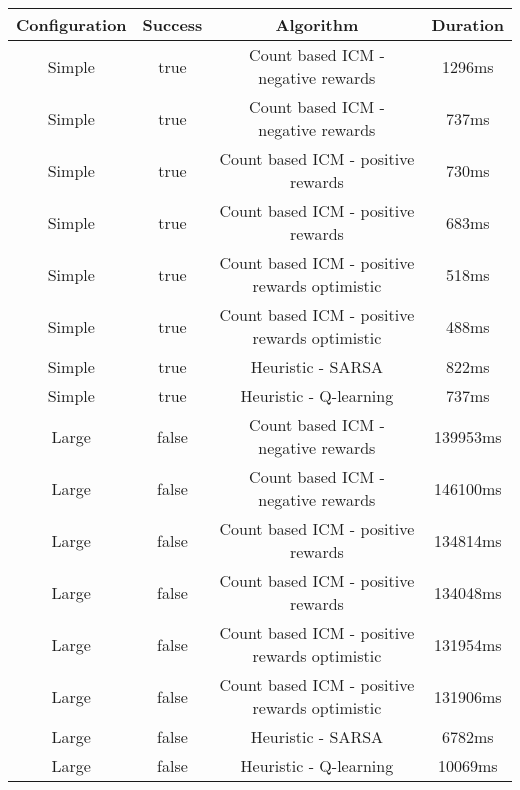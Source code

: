 \begin{tabular}{|c|c|c|c|}
\hline
Configuration & Success & Algorithm & Duration\\
\hline
Simple & true & Count based ICM - negative rewards & 1296ms\\
Simple & true & Count based ICM - negative rewards & 737ms\\
Simple & true & Count based ICM - positive rewards & 730ms\\
Simple & true & Count based ICM - positive rewards & 683ms\\
Simple & true & Count based ICM - positive rewards optimistic & 518ms\\
Simple & true & Count based ICM - positive rewards optimistic & 488ms\\
Simple & true & Heuristic - SARSA & 822ms\\
Simple & true & Heuristic - Q-learning & 737ms\\
Large & false & Count based ICM - negative rewards & 139953ms\\
Large & false & Count based ICM - negative rewards & 146100ms\\
Large & false & Count based ICM - positive rewards & 134814ms\\
Large & false & Count based ICM - positive rewards & 134048ms\\
Large & false & Count based ICM - positive rewards optimistic & 131954ms\\
Large & false & Count based ICM - positive rewards optimistic & 131906ms\\
Large & false & Heuristic - SARSA & 6782ms\\
Large & false & Heuristic - Q-learning & 10069ms\\
\end{tabular}